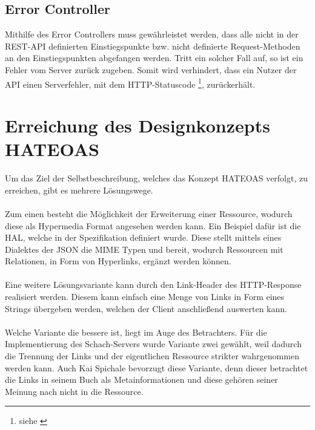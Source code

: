 \subsection{Error Controller}\label{sec:errorController}
Mithilfe des Error Controllers muss gewährleistet werden, dass alle nicht in der \gls{REST}-\gls{API} definierten Einstiegspunkte bzw. nicht definierte Request-Methoden an den Einstiegspunkten abgefangen werden. Tritt ein solcher Fall auf, so ist ein Fehler vom Server zurück zugeben. Somit wird verhindert, dass ein Nutzer der \gls{API} einen Serverfehler, mit dem HTTP-Statuscode \footnote{siehe \cite[A.2.5]{kretzschmar}}, zurückerhält.

\section{Erreichung des Designkonzepts HATEOAS}\label{sec:konzeptHATEOAS}
Um das Ziel der Selbstbeschreibung, welches das Konzept HATEOAS verfolgt, zu erreichen, gibt es mehrere Lösungswege.\\
\\
Zum einen besteht die Möglichkeit der Erweiterung einer Ressource, wodurch diese als Hypermedia Format angesehen werden kann. Ein Beispiel dafür ist die \gls{HAL}, welche in der Spezifikation \cite{halSpezification} definiert wurde. Diese stellt mittels eines Dialektes der \gls{JSON} die \gls{MIME} Typen  und  bereit, wodurch Ressourcen mit Relationen, in Form von Hyperlinks, ergänzt werden können.\\
\\
Eine weitere Lösungsvariante kann durch den Link-Header des \gls{HTTP}-Response realisiert werden. Diesem kann einfach eine Menge von Links in Form eines Strings übergeben werden, welchen der Client anschließend auswerten kann.\\
\\
Welche Variante die bessere ist, liegt im Auge des Betrachters. Für die Implementierung des Schach-Servers wurde Variante zwei gewählt, weil dadurch die Trennung der Links und der eigentlichen Ressource strikter wahrgenommen werden kann. Auch Kai Spichale bevorzugt diese Variante, denn dieser betrachtet die Links in seinem Buch \cite[158]{apiDesign} als Metainformationen und diese gehören seiner Meinung nach nicht in die Ressource.